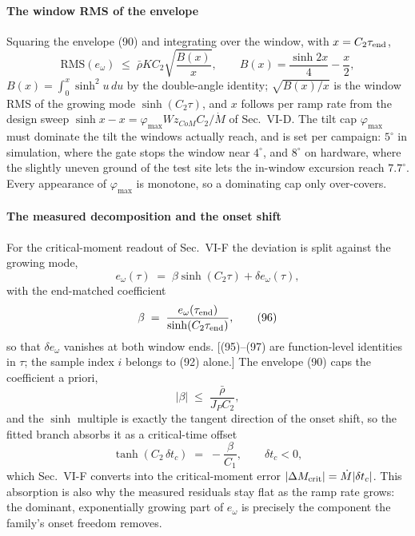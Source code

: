 \documentclass[10pt]{article}
\newcommand{\Mdot}{\dot M}
\newcommand{\rbar}{\bar\rho}
\newcommand{\rms}{\mathrm{RMS}}
\newcommand{\Wz}{W\!z_{CoM}}
\begin{document}
\paragraph*{The window RMS of the envelope}
Squaring the envelope (90) and integrating over the window, with
$x = C_2\tau_{\rm end}$,
\begin{equation}
  \rms(e_\omega) \;\le\;
  \rbar K C_2\sqrt{\frac{B(x)}{x}},
  \qquad
  B(x) = \frac{\sinh 2x}{4} - \frac{x}{2},
  \tag{94}
\end{equation}
$B(x) = \int_0^x \sinh^2 u\,du$ by the double-angle identity;
$\sqrt{B(x)/x}$ is the window RMS of the growing mode
$\sinh(C_2\tau)$, and $x$ follows per ramp rate from the design
sweep $\sinh x - x = \varphi_{\max}\Wz C_2/\Mdot$ of Sec.~VI-D. The
tilt cap $\varphi_{\max}$ must dominate the tilt the windows
actually reach, and is set per campaign: $5^\circ$ in simulation,
where the gate stops the window near $4^\circ$, and $8^\circ$ on
hardware, where the slightly uneven ground of the test site lets
the in-window excursion reach $7.7^\circ$. Every appearance of
$\varphi_{\max}$ is monotone, so a dominating cap only over-covers.

\paragraph*{The measured decomposition and the onset shift}
For the critical-moment readout of Sec.~VI-F the deviation is split
against the growing mode,
\begin{equation}
  e_\omega(\tau) \;=\; \beta\sinh(C_2\tau) + \delta e_\omega(\tau),
  \tag{95}
\end{equation}
with the end-matched coefficient
\begin{equation}
  \beta \;=\;
  \frac{e_\omega(\tau_{\rm end})}{\sinh(C_2\tau_{\rm end})},
  \tag{96}
\end{equation}
so that $\delta e_\omega$ vanishes at both window ends. [(95)--(97)
are function-level identities in $\tau$; the sample index $i$
belongs to (92) alone.] The envelope (90) caps the coefficient a
priori,
\begin{equation}
  |\beta| \;\le\; \frac{\rbar}{J_PC_2},
  \tag{97a}
\end{equation}
and the $\sinh$ multiple is exactly the tangent direction of the
onset shift, so the fitted branch absorbs it as a critical-time
offset
\begin{equation}
  \tanh(C_2\,\delta t_c) \;=\; -\frac{\beta}{C_1},
  \qquad \delta t_c < 0,
  \tag{97b}
\end{equation}
which Sec.~VI-F converts into the critical-moment error
$|\Delta M_{\rm crit}| = \Mdot|\delta t_c|$. This absorption is also
why the measured residuals stay flat as the ramp rate grows: the
dominant, exponentially growing part of $e_\omega$ is precisely the
component the family's onset freedom removes.
\end{document}
